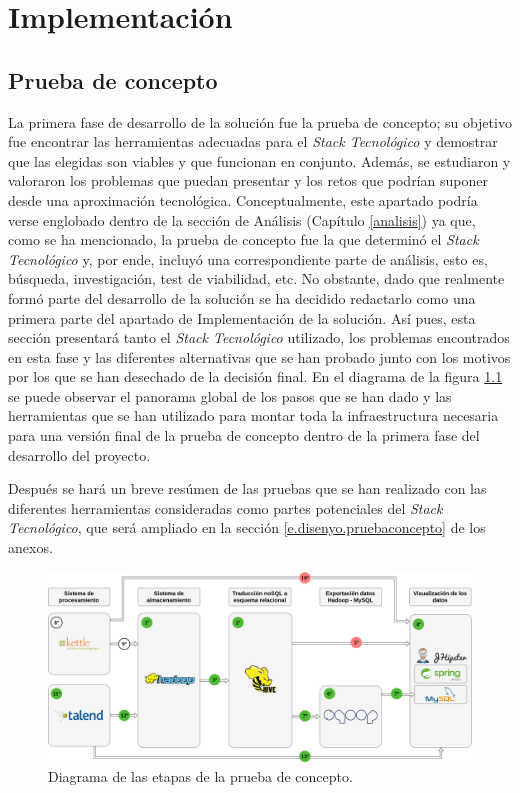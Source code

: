 \chapter{Implementación} \label{implementacion}
\section{Prueba de concepto} \label{implementacion.prueba}

La primera fase de desarrollo de la solución fue la prueba de concepto; su objetivo fue encontrar las herramientas adecuadas para el \textit{Stack Tecnológico} y demostrar que las elegidas son viables y que funcionan en conjunto. Además, se estudiaron y valoraron los problemas que puedan presentar y los retos que podrían suponer desde una aproximación tecnológica. Conceptualmente, este apartado podría verse englobado dentro de la sección de Análisis (Capítulo \ref{analisis}) ya que, como se ha mencionado, la prueba de concepto fue la que determinó el \textit{Stack Tecnológico} y, por ende, incluyó una correspondiente parte de análisis, esto es, búsqueda, investigación, test de viabilidad, etc. No obstante, dado que realmente formó parte del desarrollo de la solución se ha decidido redactarlo como una primera parte del apartado de Implementación de la solución. Así pues, esta sección presentará tanto el \textit{Stack Tecnológico} utilizado, los problemas encontrados en esta fase y las diferentes alternativas que se han probado junto con los motivos por los que se han desechado de la decisión final. En el diagrama de la figura \ref{fig:pruebaconceptoglobal} se puede observar el panorama global de los pasos que se han dado y las herramientas que se han utilizado para montar toda la infraestructura necesaria para una versión final de la prueba de concepto dentro de la primera fase del desarrollo del proyecto. 
\par Después se hará un breve resúmen de las pruebas que se han realizado con las diferentes herramientas consideradas como partes potenciales del \textit{Stack Tecnológico}, que será ampliado en la sección \ref{e.disenyo.pruebaconcepto} de los anexos.
\begin{landscape}

\begin{figure}[p!]
    
    \includegraphics[width=\linewidth]{Imagenes/pruebadeconceptoglobal}
    \caption{Diagrama de las etapas de la prueba de concepto.}
    \label{fig:pruebaconceptoglobal}
\end{figure}

\end{landscape}


